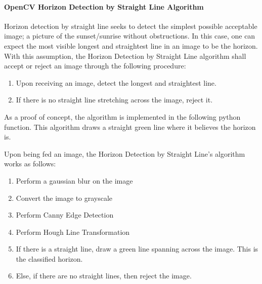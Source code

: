 \documentclass[onecolumn, draftclsnofoot,10pt, compsoc]{IEEEtran}
\begin{document}
\begin{singlespace}
      		\paragraph{OpenCV Horizon Detection by Straight Line Algorithm}
      			Horizon detection by straight line seeks to detect the simplest possible acceptable image; a picture of the sunset/sunrise without obstructions. In this case, one can expect the most visible longest and straightest line in an image to be the horizon. With this assumption, the Horizon Detection by Straight Line algorithm shall accept or reject an image through the following procedure:
      			\begin{enumerate}
      				\item Upon receiving an image, detect the longest and straightest line.
      				\item If there is no straight line stretching across the image, reject it.
      			\end{enumerate}
      			As a proof of concept, the algorithm is implemented in the following python function. This algorithm draws a straight green line where it believes the horizon is.
      			
     			
     			Upon being fed an image, the Horizon Detection by Straight Line’s algorithm works as follows:
				

				\begin{enumerate}
					\item Perform a gaussian blur on the image
					\item Convert the image to grayscale
					\item Perform Canny Edge Detection \cite{svm}
					\item Perform Hough Line Transformation \cite{svm}
					\item If there is a straight line, draw a green line spanning across the image. This is the classified horizon.
					\item Else, if there are no straight lines, then reject the image.
				\end{enumerate}



\end{singlespace}
\end{document}
